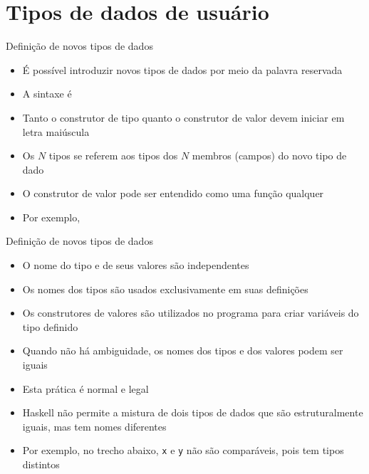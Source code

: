 \section{Tipos de dados de usuário}

\begin{frame}[fragile]{Definição de novos tipos de dados}

    \begin{itemize}
        \item É possível introduzir novos tipos de dados por meio da palavra reservada

        \item A sintaxe é


        \item Tanto o construtor de tipo quanto o construtor de valor devem iniciar em
            letra maiúscula

        \item Os $N$ tipos se referem aos tipos dos $N$ membros (campos) do novo tipo de dado

        \item O construtor de valor pode ser entendido como uma função qualquer

        \item Por exemplo, 

    \end{itemize}

\end{frame}

\begin{frame}[fragile]{Definição de novos tipos de dados}

    \begin{itemize}
        \item O nome do  tipo e de seus valores são independentes

        \item Os nomes dos tipos são usados exclusivamente em suas definições

        \item Os construtores de valores são utilizados no programa para criar variáveis do
            tipo definido

        \item Quando não há ambiguidade, os nomes dos tipos e dos valores podem ser iguais

        \item Esta prática é normal e legal

        \item Haskell não permite a mistura de dois tipos de dados que são estruturalmente
            iguais, mas tem nomes diferentes

        \item Por exemplo, no trecho abaixo,
        \texttt{x} e \texttt{y} não são comparáveis, pois tem tipos distintos
    \end{itemize}

\end{frame}

